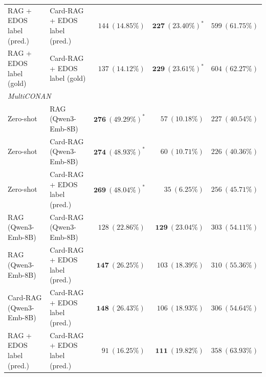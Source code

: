 \begin{table}[t]
{\begin{tabular}{llrrr}
RAG + EDOS label (pred.) & Card-RAG + EDOS label (pred.) & $144\ (14.85\%)$ & $\mathbf{227\ (23.40\%)}^*$ & $599\ (61.75\%)$ \\
RAG + EDOS label (gold) & Card-RAG + EDOS label (gold) & $137\ (14.12\%)$ & $\mathbf{229\ (23.61\%)}^*$ & $604\ (62.27\%)$ \\
\midrule
\multicolumn{5}{l}{\textit{MultiCONAN}} \\
Zero-shot & RAG (Qwen3-Emb-8B) & $\mathbf{276\ (49.29\%)}^*$ & $57\ (10.18\%)$ & $227\ (40.54\%)$ \\
Zero-shot & Card-RAG (Qwen3-Emb-8B) & $\mathbf{274\ (48.93\%)}^*$ & $60\ (10.71\%)$ & $226\ (40.36\%)$ \\
Zero-shot & Card-RAG + EDOS label (pred.) & $\mathbf{269\ (48.04\%)}^*$ & $35\ (6.25\%)$ & $256\ (45.71\%)$ \\
RAG (Qwen3-Emb-8B) & Card-RAG (Qwen3-Emb-8B) & $128\ (22.86\%)$ & $\mathbf{129\ (23.04\%)}$ & $303\ (54.11\%)$ \\
RAG (Qwen3-Emb-8B) & Card-RAG + EDOS label (pred.) & $\mathbf{147\ (26.25\%)}$ & $103\ (18.39\%)$ & $310\ (55.36\%)$ \\
Card-RAG (Qwen3-Emb-8B) & Card-RAG + EDOS label (pred.) & $\mathbf{148\ (26.43\%)}$ & $106\ (18.93\%)$ & $306\ (54.64\%)$ \\
RAG + EDOS label (pred.) & Card-RAG + EDOS label (pred.) & $91\ (16.25\%)$ & $\mathbf{111\ (19.82\%)}$ & $358\ (63.93\%)$ \\
\bottomrule
\end{tabular}%
}
\end{table}
